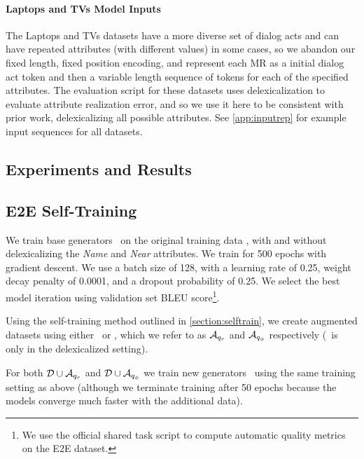 \paragraph{Laptops and TVs Model Inputs}
The Laptops and TVs datasets have a more diverse set of dialog acts
and can have repeated attributes (with different values)  in some cases, so we 
abandon our fixed length, fixed position encoding, and represent
each MR as a initial dialog act token and then a variable length sequence
of tokens for each of the specified attributes. 
The evaluation script for these datasets uses delexicalization
to evaluate attribute realization error, and so we use it here to be 
consistent with prior work, 
delexicalizing all possible attributes.
See \autoref{app:inputrep} for example input sequences for all datasets.




\subsection{Experiments and Results}

\subsection{E2E Self-Training}
 We train base generators \basegen~on the original training data \trdata, 
 with and without
delexicalizing the \textit{Name} and \textit{Near} attributes. 
We train for 500 epochs with gradient descent. We use a batch size of 128,
with a learning rate of 0.25, weight decay penalty of 0.0001, and a dropout 
probability of 0.25.
We select the best model iteration using validation
set BLEU score\footnote{We use the official shared task script to
compute automatic quality metrics on the E2E dataset.}.

Using the self-training method outlined in \autoref{section:selftrain},
we create augmented datasets using either ~or
\learnedclf, which we refer to as 
$\mathcal{A}_{q_r}$ and $\mathcal{A}_{q_\phi}$ respectively 
(\learnedclf~is only in the delexicalized setting).

For both $\mathcal{D} \cup \mathcal{A}_{q_r}$ and 
$\mathcal{D} \cup \mathcal{A}_{q_\phi}$ we train new generators \auggen~using 
the same training setting as above (although we terminate training after 50 
epochs
because the models converge much faster with the additional data).

